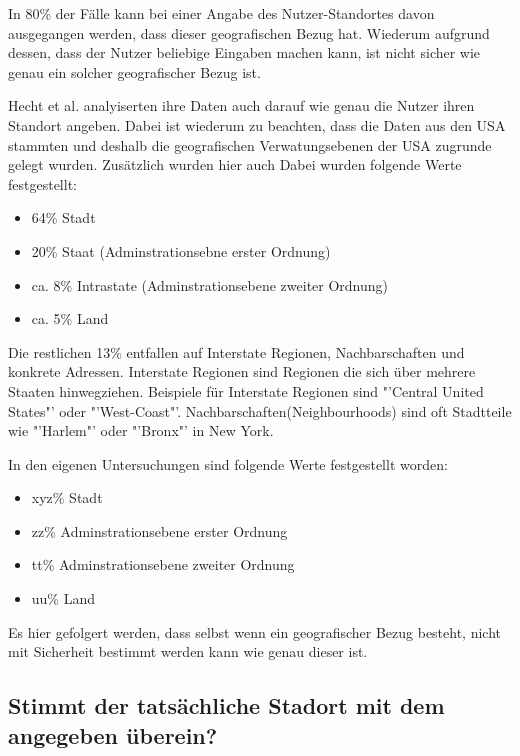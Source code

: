 			In 80\% der Fälle kann bei einer Angabe des Nutzer-Standortes davon ausgegangen werden, dass dieser geografischen Bezug hat.
			Wiederum aufgrund dessen, dass der Nutzer beliebige Eingaben machen kann, ist nicht sicher wie genau ein solcher geografischer Bezug ist. 
			
			Hecht et al. analyiserten ihre Daten auch darauf wie genau die Nutzer ihren Standort angeben.
			Dabei ist wiederum zu beachten, dass die Daten aus den USA stammten und deshalb die geografischen Verwatungsebenen der USA zugrunde gelegt wurden.
			Zusätzlich wurden hier auch 
			Dabei wurden folgende Werte festgestellt:

			\begin{itemize}
			 	\item 64\% Stadt 
			 	\item 20\% Staat (Adminstrationsebne erster Ordnung)
			 	\item ca. 8\% Intrastate (Adminstrationsebene zweiter Ordnung)
			 	\item ca. 5\% Land
			 \end{itemize} 

			 Die restlichen 13\% entfallen auf Interstate Regionen, Nachbarschaften und konkrete Adressen. 
			 Interstate Regionen sind Regionen die sich über mehrere Staaten hinwegziehen. 
			 Beispiele für Interstate Regionen sind "'Central United States"' oder "'West-Coast"'.
			 Nachbarschaften(Neighbourhoods) sind oft Stadtteile wie "'Harlem"' oder "'Bronx"' in New York.

			 In den eigenen Untersuchungen sind folgende Werte festgestellt worden:

			\begin{itemize}
			 	\item xyz\% Stadt 
			 	\item zz\% Adminstrationsebene erster Ordnung
			 	\item tt\% Adminstrationsebene zweiter Ordnung
			 	\item uu\% Land
			 \end{itemize} 

			Es hier gefolgert werden, dass selbst wenn ein geografischer Bezug besteht, nicht mit Sicherheit bestimmt werden kann wie genau dieser ist.

		\subsection{Stimmt der tatsächliche Stadort mit dem angegeben überein?}


